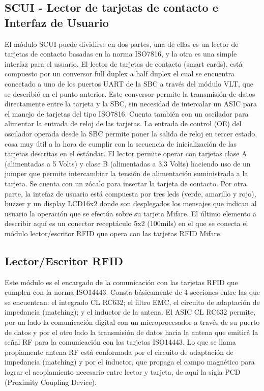 \subsection{SCUI - Lector de tarjetas de contacto e Interfaz de Usuario}
El módulo SCUI puede dividirse en dos partes, una de ellas es un lector de tarjetas de contacto basadas en la norma ISO7816, y la otra es una simple interfaz para el usuario.
El lector de tarjetas de contacto (smart cards), está compuesto por un conversor full duplex a half duplex el cual se encuentra conectado a uno de los puertos UART de la SBC a través del módulo VLT, que se describió en el punto anterior. Este conversor permite la transmisión de datos directamente entre la tarjeta y la SBC, sin necesidad de intercalar un ASIC para el manejo de tarjetas del tipo ISO7816. Cuenta también con un oscilador para alimentar la entrada de reloj de las tarjetas. La entrada de control (OE) del oscilador operada desde la SBC permite poner la salida de reloj en tercer estado, cosa muy útil a la hora de cumplir con la secuencia de inicialización de las tarjetas descritas en el estándar. El lector permite operar con tarjetas clase A (alimentadas a 5 Volts) y clase B (alimentadas a 3,3 Volts) haciendo uso de un jumper que permite intercambiar la tensión de alimentación suministrada a la tarjeta. Se cuenta con un zócalo para insertar la tarjeta de contacto.
Por otra parte, la intefaz de usuario está compuesta por tres leds (verde, amarillo y rojo), buzzer y un display LCD16x2 donde son desplegados los mensajes que indican al usuario la operación que se efectúa sobre su tarjeta Mifare.
El último elemento a describir aquí es un conector receptáculo 5x2 (100mils) en el que se conecta el módulo lector/escritor RFID que opera con las tarjetas RFID Mifare.

\subsection{Lector/Escritor RFID}
Este módulo es el encargado de la comunicación con las tarjetas RFID que cumplen con la norma ISO14443. Consta básicamente de 4 secciones entre las que se encuentran: el integrado CL RC632; el filtro EMC, el circuito de adaptación de impedancia (matching); y el inductor de la antena. 
El ASIC CL RC632 permite, por un lado la comunicación digital con un microprocesador a través de su puerto de datos y por el otro lado la transmisión de datos hacia la antena que emitirá la señal RF para la comunicación con las tarjetas ISO14443. 
Lo que se llama propiamente antena RF está conformada por el circuito de adaptación de impedancia (matching) y por el inductor, que propaga el campo magnético para lograr el acoplamiento necesario entre lector y tarjeta, de aquí la sigla PCD (Proximity Coupling Device).

